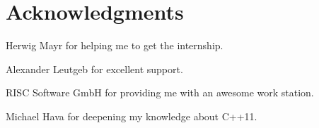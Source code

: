\section*{Acknowledgments}

Herwig Mayr for helping me to get the internship.

Alexander Leutgeb for excellent support.

RISC Software GmbH for providing me with an awesome work station.

Michael Hava for deepening my knowledge about C++11.